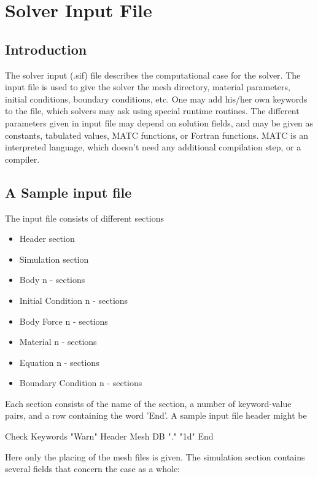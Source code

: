 \chapter{Solver Input File}
\noindent
                                                                                                                 
\section{Introduction}
                                                                                                                 
The solver input (.sif) file describes the
computational case for the solver.  The
input file is used to give the solver
the mesh directory,  material parameters, initial
conditions, boundary conditions, etc.
One  may add his/her own keywords to the file,
which solvers may ask using special runtime routines.
The different parameters given in input file may
depend on solution fields, and may be given as constants, tabulated
values,  MATC  functions, or Fortran  functions. MATC is an
interpreted language, which doesn't need any
additional compilation step, or a compiler.

\section{A Sample input file}

The input file consists of different sections
\begin{itemize}
\item Header section
\item Simulation section
\item Body n - sections
\item Initial Condition n - sections
\item Body Force n - sections
\item Material n - sections
\item Equation n - sections
\item Boundary Condition n - sections
\end{itemize}

Each section consists of the name of the section, a number of
keyword-value pairs, and a row containing the word 'End'.
A sample input file header might be 

\ttbegin
Check Keywords "Warn"
Header
  Mesh DB "." "1d"
End
\ttend

Here only the placing of the mesh files is given. The simulation
section contains several fields that concern the case as a whole:

